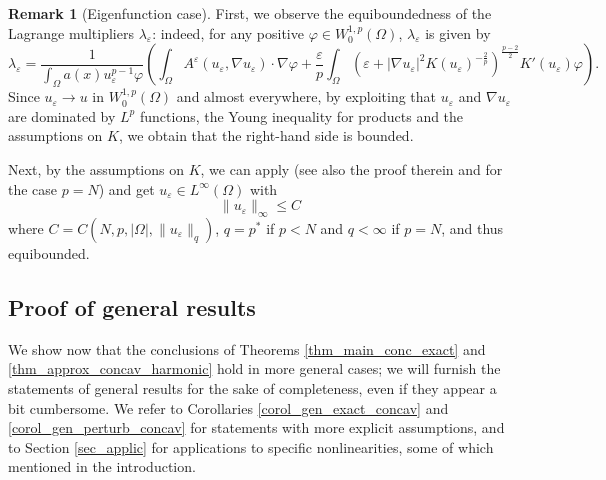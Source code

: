 \documentclass[11pt, reqno]{amsart}
\theoremstyle{definition}
\newtheorem{remark}[lemma]{Remark}
\numberwithin{equation}{section}
\def\eps{\varepsilon}
\def\norm#1{\|#1\|}
\begin{document}
\begin{remark}[Eigenfunction case]
First, we observe the equiboundedness of the Lagrange multipliers $\lambda_{\eps}$: indeed, 
for any positive $\varphi \in W^{1,p}_0(\Omega)$, $\lambda_{\eps}$ is given by
$$\lambda_{\eps} = \frac{1}{ \int_{\Omega} a(x) u_{\eps}^{p-1} \varphi} \left( \int_{\Omega} A^{\eps}(u_{\eps}, \nabla u_{\eps}) \cdot \nabla \varphi + \frac{\eps}{p} \int_{\Omega} \left(\eps + |\nabla u_{\eps}|^2 K(u_{\eps})^{-\frac{2}{p}}\right)^{\frac{p-2}{2}} K'(u_{\eps}) \varphi \right). $$
Since $u_{\eps} \to u$ in $W^{1,p}_0(\Omega)$ and almost everywhere, by exploiting that $u_{\eps}$ and $\nabla u_{\eps}$ are dominated by $L^p$ functions, the Young inequality for products and the assumptions on $K$, we obtain that the right-hand side is bounded. 

Next, by the assumptions on $K$, we can apply \cite[Theorem 7.1, Section 4.7]{LaUr66} (see also the proof therein and \cite[Theorem 5.1, Section 2.5]{LaUr66} for the case $p=N$) and get $u_{\eps} \in L^{\infty}(\Omega)$ with
$$\norm{u_{\eps}}_{\infty} \leq C$$
where $C=C(N,p, |\Omega|, \norm{u_{\eps}}_{q})$, $q=p^*$ if $p<N$ and $q<\infty$ if $p=N$, and thus equibounded.
\end{remark}


\subsection{Proof of general results}
\label{sec_gener_result}

We show now that the conclusions of Theorems \ref{thm_main_conc_exact} and \ref{thm_approx_concav_harmonic} hold in more general cases; 
we will furnish the statements of general results for the sake of completeness, even if they appear a bit cumbersome.
We refer to Corollaries \ref{corol_gen_exact_concav} and \ref{corol_gen_perturb_concav} for statements with more explicit assumptions, and to Section \ref{sec_applic} for applications to specific nonlinearities, some of which mentioned in the introduction.
\end{document}
